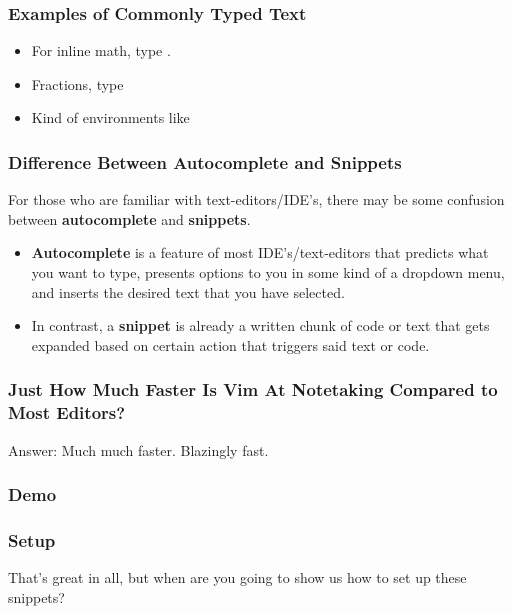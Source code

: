 \documentclass{beamer}
\begin{document}
\begin{frame}
    \frametitle{Examples of Commonly Typed Text} 
    \begin{itemize}
        \item  For inline math, type .  
        \item Fractions, type   
        \item Kind of environments like 
    \end{itemize}
\end{frame}

\begin{frame}
    \frametitle{Difference Between Autocomplete and Snippets}
    For those who are familiar with text-editors/IDE's, there may be some confusion between \textbf{autocomplete} and \textbf{snippets}.  
    \begin{itemize}
        \item \textbf{Autocomplete} is a feature of most IDE's/text-editors that predicts what you want to type, presents options to you in some kind of a dropdown menu, and inserts the desired text that you have selected. 
        \item In contrast, a \textbf{snippet} is already a written chunk of code or text that gets expanded based on certain action that triggers said text or code. 
    \end{itemize}
\end{frame}

\begin{frame}
    \frametitle{Just How Much Faster Is Vim At Notetaking Compared to Most Editors?}
    Answer: Much much faster. Blazingly fast.
\end{frame}

\begin{frame}
    \frametitle{Demo}
\end{frame}


\begin{frame}
    \frametitle{Setup}
    That's great in all, but when are you going to show us how to set up these snippets?
\end{frame}
\end{document}
